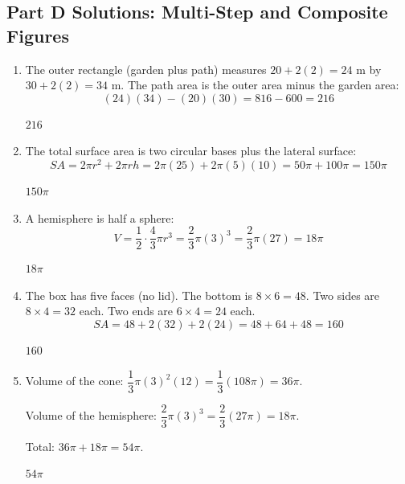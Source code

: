 \documentclass[14pt]{extarticle}
\begin{document}
\subsection*{Part D Solutions: Multi-Step and Composite Figures}
\begin{enumerate}
  \item The outer rectangle (garden plus path) measures \(20 + 2(2) = 24\) m by \(30 + 2(2) = 34\) m. The path area is the outer area minus the garden area:
  \[
  (24)(34) - (20)(30) = 816 - 600 = 216
  \]

  \(\boxed{216}\)

  \item The total surface area is two circular bases plus the lateral surface:
  \[
  SA = 2\pi r^2 + 2\pi r h = 2\pi(25) + 2\pi(5)(10) = 50\pi + 100\pi = 150\pi
  \]

  \(\boxed{150\pi}\)

  \item A hemisphere is half a sphere:
  \[
  V = \frac{1}{2} \cdot \frac{4}{3}\pi r^3 = \frac{2}{3}\pi(3)^3 = \frac{2}{3}\pi(27) = 18\pi
  \]

  \(\boxed{18\pi}\)

  \item The box has five faces (no lid). The bottom is \(8 \times 6 = 48\). Two sides are \(8 \times 4 = 32\) each. Two ends are \(6 \times 4 = 24\) each.
  \[
  SA = 48 + 2(32) + 2(24) = 48 + 64 + 48 = 160
  \]

  \(\boxed{160}\)

  \item Volume of the cone: \(\dfrac{1}{3}\pi(3)^2(12) = \dfrac{1}{3}(108\pi) = 36\pi\).

  Volume of the hemisphere: \(\dfrac{2}{3}\pi(3)^3 = \dfrac{2}{3}(27\pi) = 18\pi\).

  Total: \(36\pi + 18\pi = 54\pi\).

  \(\boxed{54\pi}\)
\end{enumerate}
\end{document}
